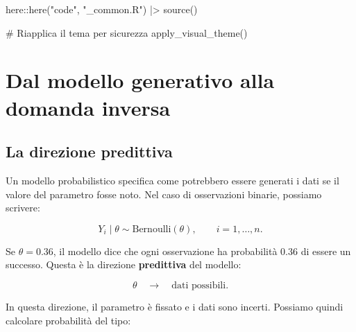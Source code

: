 \documentclass[
  italian,
  letterpaper,
  a4paper,
  11pt,
  open=any]{scrbook}
\newenvironment{Shaded}{\begin{snugshade}}{\end{snugshade}}
\newcommand{\CommentTok}[1]{\textcolor[rgb]{0.37,0.37,0.37}{#1}}
\newcommand{\FunctionTok}[1]{\textcolor[rgb]{0.28,0.35,0.67}{#1}}
\newcommand{\NormalTok}[1]{\textcolor[rgb]{0.00,0.23,0.31}{#1}}
\newcommand{\SpecialCharTok}[1]{\textcolor[rgb]{0.37,0.37,0.37}{#1}}
\newcommand{\StringTok}[1]{\textcolor[rgb]{0.13,0.47,0.30}{#1}}
\theoremstyle{plain}
\theoremstyle{definition}
\theoremstyle{definition}
\theoremstyle{remark}
\begin{document}
\begin{tcolorbox}[enhanced jigsaw, arc=.35mm, bottomrule=.15mm, bottomtitle=1mm, breakable, colback=white, colbacktitle=quarto-callout-caution-color!10!white, colframe=quarto-callout-caution-color-frame, coltitle=black, left=2mm, leftrule=.75mm, opacityback=0, opacitybacktitle=0.6, rightrule=.15mm, title=\textcolor{quarto-callout-caution-color}{\faFire}\hspace{0.5em}{Preparazione del Notebook}, titlerule=0mm, toprule=.15mm, toptitle=1mm]

\begin{Shaded}
\begin{Highlighting}[]
\NormalTok{here}\SpecialCharTok{::}\FunctionTok{here}\NormalTok{(}\StringTok{"code"}\NormalTok{, }\StringTok{"\_common.R"}\NormalTok{) }\SpecialCharTok{|\textgreater{}} 
  \FunctionTok{source}\NormalTok{()}

\CommentTok{\# Riapplica il tema per sicurezza}
\FunctionTok{apply\_visual\_theme}\NormalTok{()}
\end{Highlighting}
\end{Shaded}

\end{tcolorbox}

\section{Dal modello generativo alla domanda
inversa}\label{sec-likelihood-inverse-question}

\subsection{La direzione predittiva}\label{la-direzione-predittiva}

Un modello probabilistico specifica come potrebbero essere generati i
dati se il valore del parametro fosse noto. Nel caso di osservazioni
binarie, possiamo scrivere:

\[
Y_i \mid \theta \sim \text{Bernoulli}(\theta), \qquad i = 1, \ldots, n.
\]

Se \(\theta = 0.36\), il modello dice che ogni osservazione ha
probabilità 0.36 di essere un successo. Questa è la direzione
\textbf{predittiva} del modello:

\[
\theta \quad \longrightarrow \quad \text{dati possibili}.
\]

In questa direzione, il parametro è fissato e i dati sono incerti.
Possiamo quindi calcolare probabilità del tipo:
\end{document}
